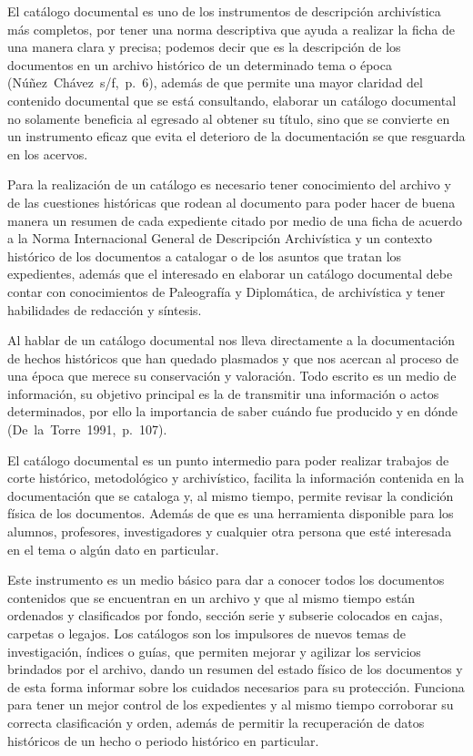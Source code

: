 El catálogo documental es uno de los instrumentos de descripción 
archivística más completos, por tener una norma descriptiva que ayuda a 
realizar la ficha de una manera clara y precisa; podemos decir que es 
la descripción de los documentos en un archivo histórico de un 
determinado tema o época (Núñez~Chávez~s\slash{}f,~p.~6), además de que permite 
una mayor claridad del contenido documental que se está consultando, elaborar un 
catálogo documental no solamente beneficia al egresado al obtener su 
título, sino que se convierte en un instrumento eficaz que evita el 
deterioro de la documentación se que resguarda en los acervos.

\enlargethispage{\baselineskip}
Para la realización de un catálogo es necesario tener conocimiento del 
archivo y de las cuestiones históricas que rodean al documento para 
poder hacer de buena manera un resumen de cada expediente citado por 
medio de una ficha de acuerdo a la Norma Internacional General de 
Descripción Archivística y un contexto histórico de los documentos a 
catalogar o de los asuntos que tratan los expedientes, además que el 
interesado en elaborar un catálogo documental debe contar con 
conocimientos de Paleografía y Diplomática, de archivística y tener 
habilidades de redacción y síntesis.

Al hablar de un catálogo documental nos lleva directamente a la documentación de
hechos históricos que han quedado plasmados y que nos acercan al proceso de una época 
que merece su conservación y valoración. Todo escrito es un medio de información, su 
objetivo principal es la de transmitir una información o actos determinados, por ello 
la importancia de saber cuándo fue producido y en dónde \mbox{(De~la~Torre~1991,~p.~107)}.

El catálogo documental es un punto intermedio para poder realizar 
trabajos de corte histórico, metodológico y archivístico, facilita la 
información contenida en la documentación que se cataloga y, al mismo tiempo, 
permite revisar la condición física de los documentos. Además de que es 
una herramienta disponible para los alumnos, profesores, investigadores 
y cualquier otra persona que esté interesada en el tema o algún dato en 
particular.

Este instrumento es un medio básico para dar a conocer todos los 
documentos contenidos que se encuentran en un archivo y que al mismo 
tiempo están ordenados y clasificados por fondo, sección serie y 
subserie colocados en cajas, carpetas o legajos. Los catálogos son los 
impulsores de nuevos temas de investigación, índices o guías, que 
permiten mejorar y agilizar los servicios brindados por el archivo, 
dando un resumen del estado físico de los documentos y de esta forma 
informar sobre los cuidados necesarios para su protección. Funciona 
para tener un mejor control de los expedientes y al mismo tiempo 
corroborar su correcta clasificación y orden, además de permitir la 
recuperación de datos históricos de un hecho o periodo histórico en 
particular.

